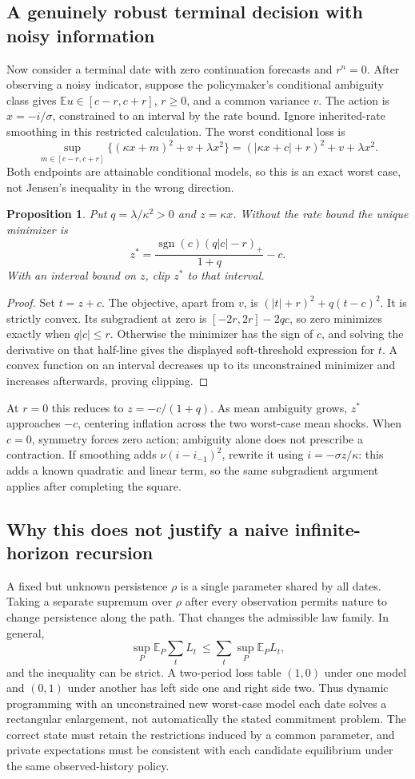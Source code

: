 \documentclass[11pt]{article}
\newtheorem{proposition}{Proposition}
\newcommand{\E}{\mathbb E}
\begin{document}
\subsection*{A genuinely robust terminal decision with noisy information}
Now consider a terminal date with zero continuation forecasts and $r^n=0$.
After observing a noisy indicator, suppose the policymaker's conditional
ambiguity class gives $\E u\in[c-r,c+r]$, $r\geq0$, and a common variance
$v$. The action is $x=-i/\sigma$, constrained to an interval by the rate
bound. Ignore inherited-rate smoothing in this restricted calculation.
The worst conditional loss is
\[
 \sup_{m\in[c-r,c+r]}\{(\kappa x+m)^2+v+\lambda x^2\}
 =(|\kappa x+c|+r)^2+v+\lambda x^2.
\]
Both endpoints are attainable conditional models, so this is an exact
worst case, not Jensen's inequality in the wrong direction.

\begin{proposition}
Put $q=\lambda/\kappa^2>0$ and $z=\kappa x$. Without the rate bound the
unique minimizer is
\[
 z^*=\frac{\operatorname{sgn}(c)(q|c|-r)_+}{1+q}-c.
\]
With an interval bound on $z$, clip $z^*$ to that interval.
\end{proposition}
\begin{proof}
Set $t=z+c$. The objective, apart from $v$, is
$(|t|+r)^2+q(t-c)^2$. It is strictly convex. Its subgradient at zero is
$[-2r,2r]-2qc$, so zero minimizes exactly when $q|c|\leq r$.
Otherwise the minimizer has the sign of $c$, and solving the derivative
on that half-line gives the displayed soft-threshold expression for $t$.
A convex function on an interval decreases up to its unconstrained
minimizer and increases afterwards, proving clipping.
\end{proof}
At $r=0$ this reduces to $z=-c/(1+q)$. As mean ambiguity grows, $z^*$
approaches $-c$, centering inflation across the two worst-case mean shocks.
When $c=0$, symmetry forces zero action; ambiguity alone does not prescribe
a contraction. If smoothing adds $\nu(i-i_{-1})^2$, rewrite it using
$i=-\sigma z/\kappa$: this adds a known quadratic and linear term, so
the same subgradient argument applies after completing the square.

\subsection*{Why this does not justify a naive infinite-horizon recursion}
A fixed but unknown persistence $\rho$ is a single parameter shared by all
dates. Taking a separate supremum over $\rho$ after every observation permits
nature to change persistence along the path. That changes the admissible
law family. In general,
\[
 \sup_{P}\E_P\sum_t L_t\ \leq\sum_t\sup_P\E_P L_t,
\]
and the inequality can be strict. A two-period loss table $(1,0)$ under
one model and $(0,1)$ under another has left side one and right side two.
Thus dynamic programming with an unconstrained new worst-case model each
date solves a rectangular enlargement, not automatically the stated
commitment problem. The correct state must retain the restrictions induced
by a common parameter, and private expectations must be consistent with
each candidate equilibrium under the same observed-history policy.
\end{document}
